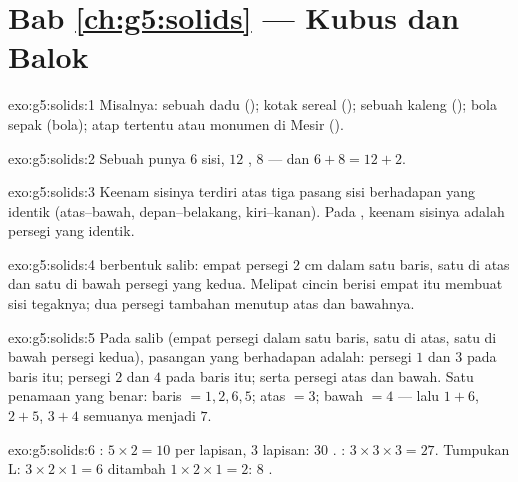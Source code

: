 \section*{Bab \ref{ch:g5:solids} --- Kubus dan Balok}

\begin{solution}{exo:g5:solids:1}
Misalnya: sebuah dadu (); kotak sereal (); sebuah kaleng
(); bola sepak (bola); atap tertentu atau monumen di Mesir
().
\end{solution}

\begin{solution}{exo:g5:solids:2}
Sebuah  punya $6$ sisi, $12$ , $8$  --- dan
$6 + 8 = 12 + 2$. \checkmark
\end{solution}

\begin{solution}{exo:g5:solids:3}
Keenam sisinya terdiri atas tiga pasang sisi berhadapan yang
identik (atas--bawah, depan--belakang, kiri--kanan). Pada ,
keenam sisinya adalah persegi yang identik.
\end{solution}

\begin{solution}{exo:g5:solids:4}
 berbentuk salib: empat persegi $2$ cm dalam satu
baris, satu di atas dan satu di bawah persegi yang kedua. Melipat
cincin berisi empat itu membuat sisi tegaknya; dua persegi tambahan
menutup atas dan bawahnya.
\end{solution}

\begin{solution}{exo:g5:solids:5}
Pada  salib (empat persegi dalam satu baris, satu di
atas, satu di bawah persegi kedua), pasangan yang berhadapan adalah:
persegi $1$ dan $3$ pada baris itu; persegi $2$ dan $4$ pada baris
itu; serta persegi atas dan bawah. Satu penamaan yang benar: baris
$= 1, 2, 6, 5$; atas $= 3$; bawah $= 4$ --- lalu $1{+}6$, $2{+}5$,
$3{+}4$ semuanya menjadi $7$.
\end{solution}

\begin{solution}{exo:g5:solids:6}
: $5 \times 2 = 10$ per lapisan, $3$ lapisan: $30$ .
: $3 \times 3 \times 3 = 27$. Tumpukan L:
$3 \times 2 \times 1 = 6$ ditambah $1 \times 2 \times 1 = 2$: $8$ .
\end{solution}

